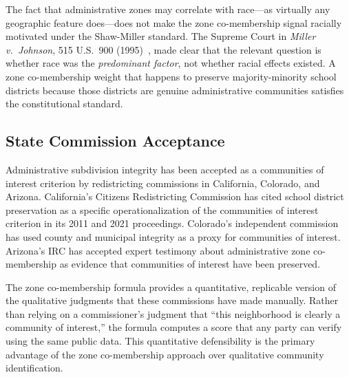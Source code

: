 The fact that administrative zones may correlate with race---as virtually any
geographic feature does---does not make the zone co-membership signal racially
motivated under the Shaw-Miller standard.
The Supreme Court in \textit{Miller v.\ Johnson}, 515 U.S.\ 900 (1995)~\citep{miller1995},
made clear that the relevant question is whether race was the \emph{predominant factor},
not whether racial effects existed.
A zone co-membership weight that happens to preserve majority-minority school
districts because those districts are genuine administrative communities satisfies
the constitutional standard.

\subsection{State Commission Acceptance}

Administrative subdivision integrity has been accepted as a communities of interest
criterion by redistricting commissions in California, Colorado, and Arizona.
California's Citizens Redistricting Commission has cited school district preservation
as a specific operationalization of the communities of interest criterion in its
2011 and 2021 proceedings.
Colorado's independent commission has used county and municipal integrity as a proxy
for communities of interest.
Arizona's IRC has accepted expert testimony about administrative zone co-membership
as evidence that communities of interest have been preserved.

The zone co-membership formula provides a quantitative, replicable version of the
qualitative judgments that these commissions have made manually.
Rather than relying on a commissioner's judgment that ``this neighborhood is clearly
a community of interest,'' the formula computes a score that any party can verify
using the same public data.
This quantitative defensibility is the primary advantage of the zone co-membership
approach over qualitative community identification.
